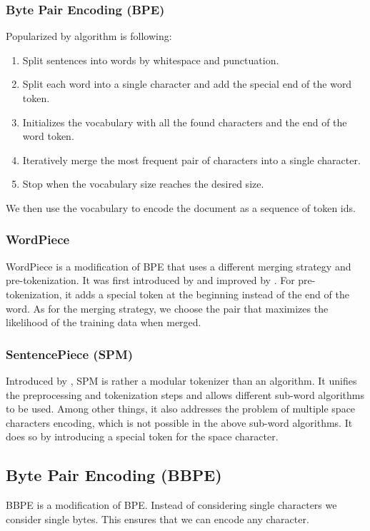     \subsubsection{Byte Pair Encoding (BPE)}
    \label{sec:bpe}
    Popularized by \cite{sennrichNeuralMachineTranslation2016b} algorithm is following:
    \begin{enumerate}
        \item Split sentences into words by whitespace and punctuation.
        \item Split each word into a single character and add the special end of the word token.
        \item Initializes the vocabulary with all the found characters and the end of the word token.
        \item Iteratively merge the most frequent pair of characters into a single character.
        \item Stop when the vocabulary size reaches the desired size.
    \end{enumerate}
    We then use the vocabulary to encode the document as a sequence of token ids.

    \subsubsection{WordPiece}
    \label{sec:wordpiece}
    WordPiece is a modification of BPE that uses a different merging
    strategy and pre-tokenization. It was first introduced by \cite{schusterJapaneseKoreanVoice2012}
    and improved by \cite{wuGoogleNeuralMachine2016}.
    For pre-tokenization, it adds a special token at the beginning instead of the end of the word.
    As for the merging strategy, we choose the pair that maximizes the likelihood of the training data when merged.

    \subsubsection{SentencePiece (SPM)}
    \label{sec:spm}
    Introduced by \cite{kudoSentencePieceSimpleLanguage2018}, SPM is rather a modular tokenizer than an algorithm.
    It unifies the preprocessing and tokenization steps and allows different sub-word algorithms to be used.
    Among other things, it also addresses the problem of multiple space characters encoding, which is not possible in the above sub-word algorithms.
    It does so by introducing a special token for the space character.


    \subsection{Byte Pair Encoding (BBPE)}
    \label{sec:bbpe}
    BBPE is a modification of BPE. Instead of considering single characters we consider single bytes.
    This ensures that we can encode any character.

